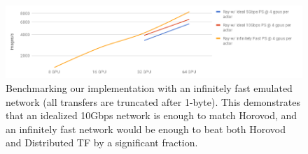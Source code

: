 

\begin{figure}[tb]
    \centering
    \includegraphics[width=5.1in,keepaspectratio]{fig/infnet.png}
    \caption{
    \small{
        Benchmarking our implementation with an infinitely fast emulated network (all transfers are truncated after 1-byte). This demonstrates that an idealized 10Gbps network is enough to match Horovod, and an infinitely fast network would be enough to beat both Horovod and Distributed TF by a significant fraction.
    }
    }
    \label{fig:infnet}
\end{figure}


